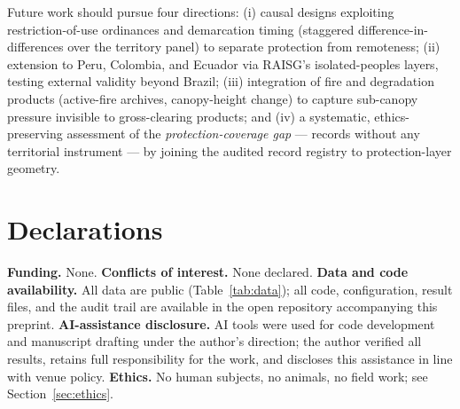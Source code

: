 Future work should pursue four directions: (i) causal designs exploiting restriction-of-use ordinances and demarcation timing (staggered difference-in-differences over the territory panel) to separate protection from remoteness; (ii) extension to Peru, Colombia, and Ecuador via RAISG's isolated-peoples layers, testing external validity beyond Brazil; (iii) integration of fire and degradation products (active-fire archives, canopy-height change) to capture sub-canopy pressure invisible to gross-clearing products; and (iv) a systematic, ethics-preserving assessment of the \emph{protection-coverage gap} --- records without any territorial instrument --- by joining the audited record registry to protection-layer geometry.

\section*{Declarations}
\textbf{Funding.} None. \textbf{Conflicts of interest.} None declared. \textbf{Data and code availability.} All data are public (Table~\ref{tab:data}); all code, configuration, result files, and the audit trail are available in the open repository accompanying this preprint. \textbf{AI-assistance disclosure.} AI tools were used for code development and manuscript drafting under the author's direction; the author verified all results, retains full responsibility for the work, and discloses this assistance in line with venue policy. \textbf{Ethics.} No human subjects, no animals, no field work; see Section~\ref{sec:ethics}.

